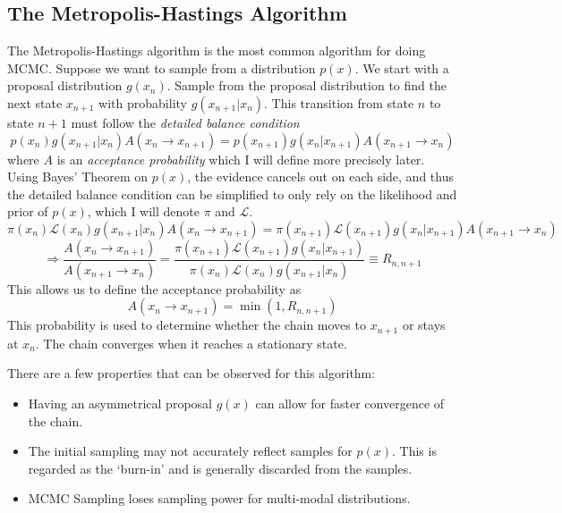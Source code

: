 \subsection{The Metropolis-Hastings Algorithm}
The Metropolis-Hastings algorithm is the most common algorithm for doing MCMC. Suppose we want to sample from a distribution $p(x)$. We start with a proposal distribution $g(x_n)$. 
Sample from the proposal distribution to find the next state $x_{n+1}$ with probability $g(x_{n+1}|x_n)$. 
This transition from state $n$ to state $n+1$ must follow the \textit{detailed balance condition}
\begin{equation}
	p(x_n) g(x_{n+1}|x_n) A(x_n \rightarrow x_{n+1}) = p(x_{n+1}) g(x_n|x_{n+1}) A(x_{n+1} \rightarrow x_{n})
\end{equation}
where $A$ is an \textit{acceptance probability} which I will define more precisely later. 
Using Bayes' Theorem on $p(x)$, the evidence cancels out on each side, 
and thus the detailed balance condition can be simplified to only rely on the likelihood and prior of $p(x)$, 
which I will denote $\pi$ and $\mathcal{L}$.
\begin{equation}
	\pi(x_n)\mathcal{L}(x_n) g(x_{n+1}|x_n) A(x_n \rightarrow x_{n+1}) = \pi(x_{n+1}) \mathcal{L}(x_{n+1}) g(x_{n}|x_{n+1}) A(x_{n+1}\rightarrow x_{n})
\end{equation}
\begin{equation}
	\Rightarrow \frac{A(x_n \rightarrow x_{n+1})}{A(x_{n+1}\rightarrow x_{n})} = \frac{\pi(x_{n+1}) \mathcal{L}(x_{n+1}) g(x_{n}|x_{n+1})}{\pi(x_n)\mathcal{L}(x_n) g(x_{n+1}|x_n)} \equiv R_{n,n+1}
\end{equation}
This allows us to define the acceptance probability as
\begin{equation}
	A(x_n \rightarrow x_{n+1}) = \min( 1, R_{n,n+1} )
\end{equation}
This probability is used to determine whether the chain moves to $x_{n+1}$ or stays at $x_n$. The chain converges when it reaches a stationary state.

There are a few properties that can be observed for this algorithm:
\begin{itemize}
    \item Having an asymmetrical proposal $g(x)$ can allow for faster convergence of the chain.
    \item The initial sampling may not accurately reflect samples for $p(x)$. 
    This is regarded as the `burn-in' and is generally discarded from the samples.
    \item MCMC Sampling loses sampling power for multi-modal distributions. 
\end{itemize}

